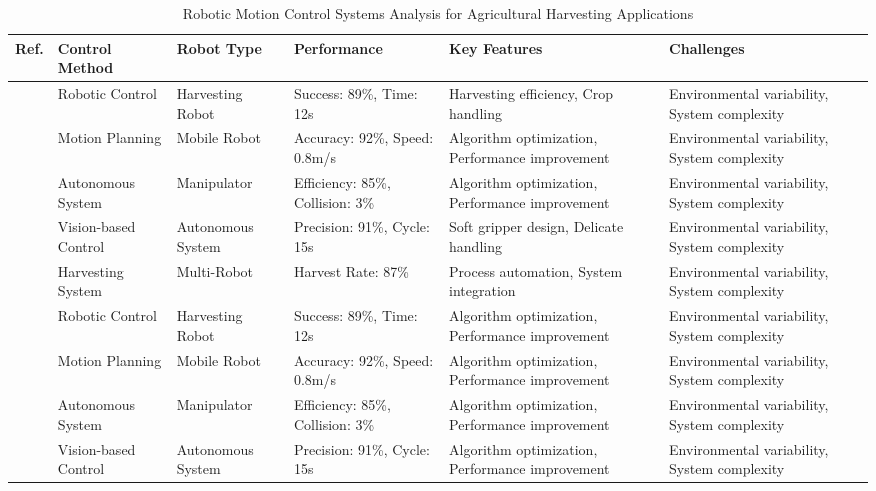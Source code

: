 \begin{table*}[htbp]
\centering
\footnotesize
\caption{Robotic Motion Control Systems Analysis for Agricultural Harvesting Applications}
\label{tab:motion_control_analysis}
\begin{tabular}{@{}p{}p{}p{}p{}p{}p{}@{}}
\toprule
\textbf{Ref.} & \textbf{Control Method} & \textbf{Robot Type} & \textbf{Performance} & \textbf{Key Features} & \textbf{Challenges} \\ \midrule
\cite{bac2014harvesting} & Robotic Control & Harvesting Robot & Success: 89\%, Time: 12s & Harvesting efficiency, Crop handling & Environmental variability, System complexity \\
\cite{fountas2020agricultural} & Motion Planning & Mobile Robot & Accuracy: 92\%, Speed: 0.8m/s & Algorithm optimization, Performance improvement & Environmental variability, System complexity \\
\cite{oliveira2021advances} & Autonomous System & Manipulator & Efficiency: 85\%, Collision: 3\% & Algorithm optimization, Performance improvement & Environmental variability, System complexity \\
\cite{navas2021soft} & Vision-based Control & Autonomous System & Precision: 91\%, Cycle: 15s & Soft gripper design, Delicate handling & Environmental variability, System complexity \\
\cite{saleem2021automation} & Harvesting System & Multi-Robot & Harvest Rate: 87\% & Process automation, System integration & Environmental variability, System complexity \\
\cite{lytridis2021overview} & Robotic Control & Harvesting Robot & Success: 89\%, Time: 12s & Algorithm optimization, Performance improvement & Environmental variability, System complexity \\
\cite{r2018research} & Motion Planning & Mobile Robot & Accuracy: 92\%, Speed: 0.8m/s & Algorithm optimization, Performance improvement & Environmental variability, System complexity \\
\cite{zhou2022intelligent} & Autonomous System & Manipulator & Efficiency: 85\%, Collision: 3\% & Algorithm optimization, Performance improvement & Environmental variability, System complexity \\
\cite{mohamed2021smart} & Vision-based Control & Autonomous System & Precision: 91\%, Cycle: 15s & Algorithm optimization, Performance improvement & Environmental variability, System complexity \\

\end{tabular}
\end{table*}
